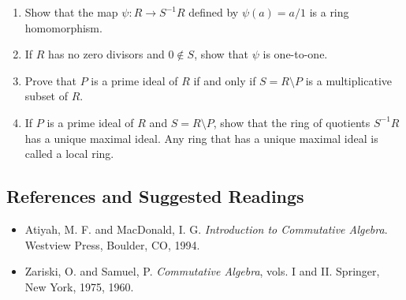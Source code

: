 {\begin{enumerate}
\begin{enumerate}
 
 \item
Show that the map $\psi : R \rightarrow S^{-1}R$ defined by $\psi(a)
= a/1$ is a ring homomorphism.
 
 \item
If $R$ has no zero divisors and $0 \notin S$, show that $\psi$ is
one-to-one.
 
 
\item
Prove that $P$ is a prime ideal of $R$ if and only if $S = R \setminus
P$ is a multiplicative subset of $R$. 
 
\item
If $P$ is a prime ideal of $R$ and $S = R \setminus P$, show that the
ring of quotients $S^{-1}R$ has a unique maximal ideal. Any ring
that has a unique maximal ideal is called a {\bfi local
ring}.  
 
 
\end{enumerate}



 
\end{enumerate}
}
 
 
 
\subsection*{References and Suggested Readings}
 
{\small
 
\begin{itemize}
 
\item[{\bf [1]}] %
Atiyah, M. F.  and MacDonald, I. G. {\it Introduction to
Commutative Algebra}. Westview Press, Boulder, CO, 1994.
 


\item[{\bf [2]}] %
Zariski, O. and Samuel, P. {\it Commutative Algebra}, vols. I
and II. Springer, New York, 1975, 1960. 
 
\end{itemize}
}
 


